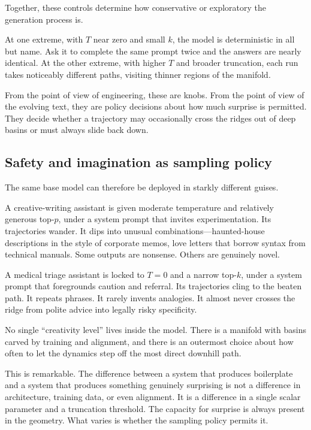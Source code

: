 \documentclass[12pt,a4paper]{book}
\begin{document}
Together, these controls determine how conservative or exploratory the generation process is.

At one extreme, with $T$ near zero and small $k$, the model is deterministic in all but name. Ask it to complete the same prompt twice and the answers are nearly identical. At the other extreme, with higher $T$ and broader truncation, each run takes noticeably different paths, visiting thinner regions of the manifold.

From the point of view of engineering, these are knobs. From the point of view of the evolving text, they are policy decisions about how much surprise is permitted. They decide whether a trajectory may occasionally cross the ridges out of deep basins or must always slide back down.

\subsection*{Safety and imagination as sampling policy}

The same base model can therefore be deployed in starkly different guises.

A creative-writing assistant is given moderate temperature and relatively generous top-$p$, under a system prompt that invites experimentation. Its trajectories wander. It dips into unusual combinations---haunted-house descriptions in the style of corporate memos, love letters that borrow syntax from technical manuals. Some outputs are nonsense. Others are genuinely novel.

A medical triage assistant is locked to $T=0$ and a narrow top-$k$, under a system prompt that foregrounds caution and referral. Its trajectories cling to the beaten path. It repeats phrases. It rarely invents analogies. It almost never crosses the ridge from polite advice into legally risky specificity.

No single ``creativity level'' lives inside the model. There is a manifold with basins carved by training and alignment, and there is an outermost choice about how often to let the dynamics step off the most direct downhill path.

This is remarkable. The difference between a system that produces boilerplate and a system that produces something genuinely surprising is not a difference in architecture, training data, or even alignment. It is a difference in a single scalar parameter and a truncation threshold. The capacity for surprise is always present in the geometry. What varies is whether the sampling policy permits it.
\end{document}
